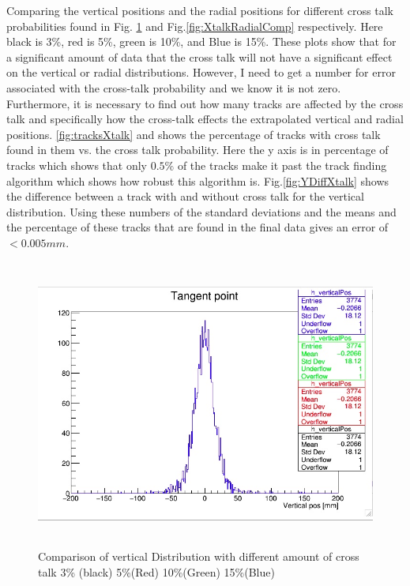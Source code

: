 \documentclass[./Thesis]{subfiles}
\begin{document}
	Comparing the vertical positions and the radial positions for different cross talk probabilities found in Fig. \ref{fig:XtalkVerticalComp} and Fig.\ref{fig:XtalkRadialComp} respectively. Here black is 3\%, red is 5\%, green is 10\%, and Blue is 15\%.  These plots show that for a significant amount of data that the cross talk will not have a significant effect on the vertical or radial distributions.  However, I need to get a number for error associated with the cross-talk probability and we know it is not zero.  Furthermore, it is necessary to find out how many tracks are affected by the cross talk and specifically how the cross-talk effects the extrapolated vertical and radial positions.  \ref{fig:tracksXtalk} and shows the percentage of tracks with cross talk found in them vs. the cross talk probability. Here the y axis is in percentage of tracks which shows that only $0.5\%$ of the tracks make it past the track finding algorithm which shows how robust this algorithm is.  Fig.\ref{fig:YDiffXtalk} shows the difference between a track with and without cross talk for the vertical distribution. Using these numbers of the standard deviations and the means and the percentage of these tracks that are found in the final data gives an error of $<0.005 mm$.

\begin{figure}
	\centerline{\includegraphics[height=95mm]{XtalkVerticalComp.jpeg}}
	\caption[ Comparison of the Vertical Distribution]{ Comparison of vertical Distribution with different amount of cross talk 3\% (black) 5\%(Red) 10\%(Green) 15\%(Blue)}
	\label{fig:XtalkVerticalComp}
\end{figure}
\end{document}

